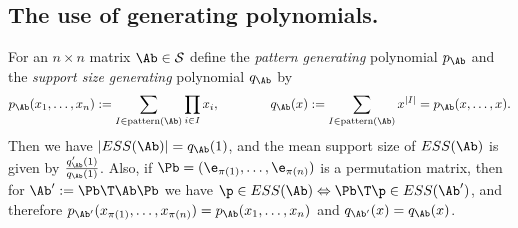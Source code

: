 \documentclass[moor]{informs3}              %
\begin{document}
\subsection{The use of generating polynomials.}\label{secgenp}

For an $n\times n$ matrix $\Ab\in\mathcal{S}$ define the \emph{pattern generating} polynomial $p_{\Ab}$ and the \emph{support size generating} polynomial $q_{\Ab}$ by
\begin{equation}\label{e:poly}
p_{\Ab}(x_1,\ldots,x_n):=\sum_{I\in\textup{pattern}(\Ab)}\prod_{i\in I}x_i,\qquad \qquad
q_{\Ab}(x):=\sum_{I\in\textup{pattern}(\Ab)}x^{|I|}=p_{\Ab}(x,\ldots,x).
\end{equation}
Then we have $|ESS(\Ab)|=q_{\Ab}(1)$, and the mean support size of $ESS(\Ab)$ is given by $\frac{q'_{\Ab}(1)}{q_{\Ab}(1)}$. Also, if $\Pb=(\e_{\pi(1)},\ldots,\e_{\pi(n)})$ is a permutation matrix,
then for $\Ab':=\Pb\T\Ab\Pb$ we have $\p\in ESS(\Ab)\Leftrightarrow \Pb\T\p\in ESS(\Ab')$, and therefore $p_{\Ab'}(x_{\pi(1)},\ldots,x_{\pi(n)})=p_{\Ab}(x_1,\ldots,x_n)$ and $q_{\Ab'}(x)=q_{\Ab}(x)$.
\end{document}
